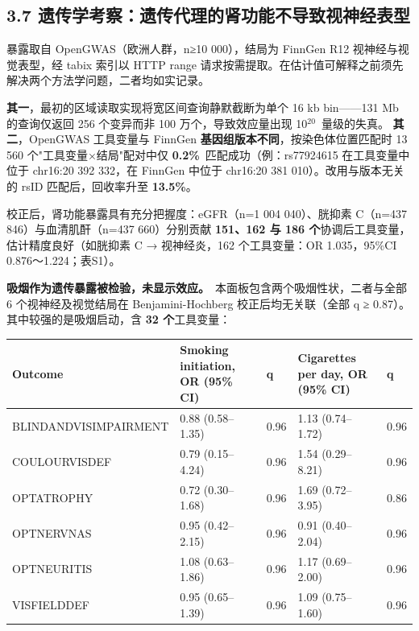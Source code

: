\documentclass[UTF8,fontset=windows,11pt]{ctexart}
\begin{document}
\subsection{3.7 遗传学考察：遗传代理的肾功能不导致视神经表型}

暴露取自 OpenGWAS（欧洲人群，n≥10 000），结局为 FinnGen R12 视神经与视觉表型，经 tabix 索引以 HTTP range 请求按需提取。在估计值可解释之前须先解决两个方法学问题，二者均如实记录。

\textbf{其一}，最初的区域读取实现将宽区间查询静默截断为单个 16 kb bin——131 Mb 的查询仅返回 256 个变异而非 100 万个，导致效应量出现 10$^{20}$\ 量级的失真。 \textbf{其二}，OpenGWAS 工具变量与 FinnGen \textbf{基因组版本不同}，按染色体位置匹配时 13 560 个"工具变量×结局"配对中仅 \textbf{0.2\%}\ 匹配成功（例：rs77924615 在工具变量中位于 chr16:20 392 332，在 FinnGen 中位于 chr16:20 381 010）。改用与版本无关的 rsID 匹配后，回收率升至 \textbf{13.5\%}。

校正后，肾功能暴露具有充分把握度：eGFR（n=1 004 040）、胱抑素 C（n=437 846）与血清肌酐（n=437 660）分别贡献 \textbf{151、162 与 186 个}协调后工具变量，估计精度良好（如胱抑素 C → 视神经炎，162 个工具变量：OR 1.035，95\%CI 0.876～1.224；表S1）。

\textbf{吸烟作为遗传暴露被检验，未显示效应。}\ 本面板包含两个吸烟性状，二者与全部 6 个视神经及视觉结局在 Benjamini-Hochberg 校正后均无关联（全部 q ≥ 0.87）。其中较强的是吸烟启动，含 \textbf{32 个}工具变量：

\begin{center}
\small
\begin{longtable}{p{}p{}p{}p{}p{}}
\hline
Outcome & Smoking initiation, OR (95\% CI) & q & Cigarettes per day, OR (95\% CI) & q \\
\hline
BLINDANDVISIMPAIRMENT & 0.88 (0.58–1.35) & 0.96 & 1.13 (0.74–1.72) & 0.96 \\
COULOURVISDEF & 0.79 (0.15–4.24) & 0.96 & 1.54 (0.29–8.21) & 0.96 \\
OPTATROPHY & 0.72 (0.30–1.68) & 0.96 & 1.69 (0.72–3.95) & 0.86 \\
OPTNERVNAS & 0.95 (0.42–2.15) & 0.96 & 0.91 (0.40–2.04) & 0.96 \\
OPTNEURITIS & 1.08 (0.63–1.86) & 0.96 & 1.17 (0.69–2.00) & 0.96 \\
VISFIELDDEF & 0.95 (0.65–1.39) & 0.96 & 1.09 (0.75–1.60) & 0.96 \\
\hline
\end{longtable}
\end{center}
\end{document}
